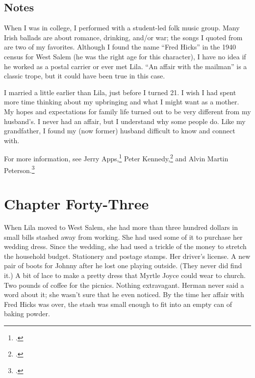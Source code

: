\documentclass[
  american,
  letterpaper,
]{book}
\begin{document}
\section{Notes}\label{notes-44}

When I was in college, I performed with a student-led folk music group.
Many Irish ballads are about romance, drinking, and/or war; the songs I
quoted from are two of my favorites. Although I found the name ``Fred
Hicks'' in the 1940 census for West Salem (he was the right age for this
character), I have no idea if he worked as a postal carrier or ever met
Lila. ``An affair with the mailman'' is a classic trope, but it could
have been true in this case.

I married a little earlier than Lila, just before I turned 21. I wish I
had spent more time thinking about my upbringing and what I might want
as a mother. My hopes and expectations for family life turned out to be
very different from my husband's. I never had an affair, but I
understand why some people do. Like my grandfather, I found my (now
former) husband difficult to know and connect with.

For more information, see Jerry Apps,\footnote{.} Peter Kennedy,\footnote{.} and
Alvin Martin Peterson.\footnote{.}


\chapter{Chapter Forty-Three}\label{chapter-forty-three}

When Lila moved to West Salem, she had more than three hundred dollars
in small bills stashed away from working. She had used some of it to
purchase her wedding dress. Since the wedding, she had used a trickle of
the money to stretch the household budget. Stationery and postage
stamps. Her driver's license. A new pair of boots for Johnny after he
lost one playing outside. (They never did find it.) A bit of lace to
make a pretty dress that Myrtle Joyce could wear to church. Two pounds
of coffee for the picnics. Nothing extravagant. Herman never said a word
about it; she wasn't sure that he even noticed. By the time her affair
with Fred Hicks was over, the stash was small enough to fit into an
empty can of baking powder.
\end{document}
